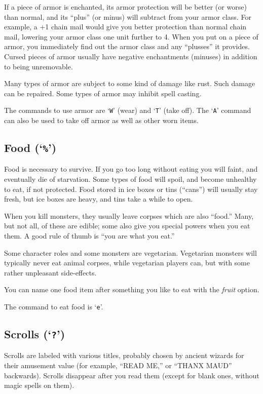 If a piece of armor is enchanted, its armor protection will be better
(or worse) than normal, and its ``plus'' (or minus) will subtract from
your armor class.  For example, a +1 chain mail would give you
better protection than normal chain mail, lowering your armor class one
unit further to 4.  When you put on a piece of armor, you immediately
find out the armor class and any ``plusses'' it provides.  Cursed
pieces of armor usually have negative enchantments (minuses) in
addition to being unremovable.

Many types of armor are subject to some kind of damage like rust.  Such
damage can be repaired.  Some types of armor may inhibit spell casting.

The commands to use armor are `{\tt W}' (wear) and `{\tt T}' (take off).
The `{\tt A}' command can also be used to take off armor as well as other
worn items.

\subsection*{Food (`{\tt \%}')}

Food is necessary to survive.  If you go too long without eating you
will faint, and eventually die of starvation.
Some types of food will spoil, and become unhealthy to eat,
if not protected.
Food stored in ice boxes or tins (``cans'')
will usually stay fresh, but ice boxes are heavy, and tins
take a while to open.

When you kill monsters, they usually leave corpses which are also
``food.''  Many, but not all, of these are edible; some also give you
special powers when you eat them.  A good rule of thumb is ``you are
what you eat.''

Some character roles and some monsters are vegetarian.  Vegetarian monsters
will typically never eat animal corpses, while vegetarian players can,
but with some rather unpleasant side-effects.

You can name one food item after something you like to eat with the
{\it fruit\/} option.

The command to eat food is `{\tt e}'.

\subsection*{Scrolls (`{\tt ?}')}

Scrolls are labeled with various titles, probably chosen by ancient wizards
for their amusement value (for example, ``READ ME,'' or ``THANX MAUD'' backwards).
Scrolls disappear after you read them (except for blank ones, without
magic spells on them).

